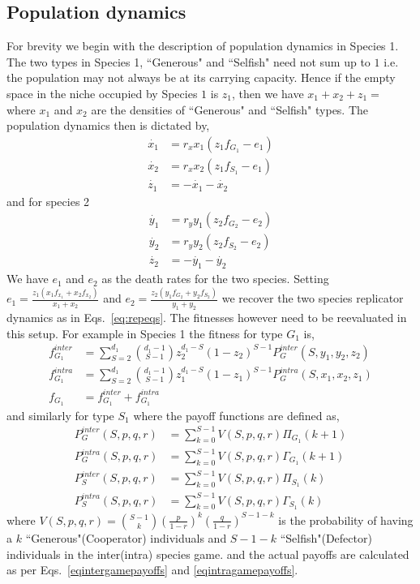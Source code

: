 \documentclass[12pt]{article}
\begin{document}
\begin{appendices}
\section{Population dynamics}

For brevity we begin with the description of population dynamics in Species 1.
The two types in Species 1, ``Generous" and ``Selfish" need not sum up to $1$ i.e. the population may not always be at its carrying capacity.
Hence if the empty space in the niche occupied by Species $1$ is $z_1$, then we have $x_1 + x_2 + z_1 = $ where $x_1$ and $x_2$ are the densities of ``Generous" and ``Selfish" types.
The population dynamics then is dictated by,
%
\begin{align}
	\dot{x_1} &= r_x x_1 (z_1 f_{G_1} - e_1) \\
	\dot{x_2} &= r_x x_2 (z_1 f_{S_1} - e_1) \\
	\dot{z_1} &= - \dot{x_1} - \dot{x_2}
\end{align}
%
and for species 2
\begin{align}
	\dot{y_1} &= r_y y_1 (z_2 f_{G_2} - e_2) \\
	\dot{y_2} &= r_y y_2 (z_2 f_{S_2} - e_2) \\
	\dot{z_2} &= - \dot{y_1} - \dot{y_2}
\end{align}
%
We have $e_1$ and $e_2$ as the death rates for the two species.
Setting $e_1 = \frac{z_1 (x_1 f_{x_1} + x_2 f_{x_2}) }{x_1 + x_2}$ and $e_2 = \frac{z_2 (y_1 f_{G_2} + y_2 f_{S_2}) }{y_1 + y_2}$ we recover the two species replicator dynamics as in Eqs.~\ref{eq:repeqs}.
The fitnesses however need to be reevaluated in this setup.
For example in Species 1 the fitness for type $G_1$ is,
%
\begin{align}
	f_{G_1}^{inter} &= \sum_{S=2}^{d_1} \binom{d_1 -1}{S-1} z_2 ^{d_1 -S} (1-z_2)^{S-1} P_G^{inter}(S,y_1,y_2,z_2) \\
	f_{G_1}^{intra} &= \sum_{S=2}^{d_1} \binom{d_1 -1}{S-1} z_1 ^{d_1 -S} (1-z_1)^{S-1} P_G^{intra}(S,x_1,x_2,z_1) \\
	f_{G_1} &= f_{G_1}^{inter} + f_{G_1}^{intra}
\end{align}
%
and similarly for type $S_1$ where the payoff functions are defined as,
%
\begin{align}
	P_G^{inter}(S,p,q,r) &= \sum_{k=0}^{S-1} V(S,p,q,r) \Pi_{G_1}(k+1) \\
	P_G^{intra}(S,p,q,r) &= \sum_{k=0}^{S-1} V(S,p,q,r) \Gamma_{G_1}(k+1) \\
	P_S^{inter}(S,p,q,r) &= \sum_{k=0}^{S-1} V(S,p,q,r) \Pi_{S_1}(k) \\
	P_S^{intra}(S,p,q,r) &= \sum_{k=0}^{S-1} V(S,p,q,r) \Gamma_{S_1}(k)
\end{align}
%
where $V(S,p,q,r) = \binom{S-1}{k} \left( \frac{p}{1-r}\right)^k  \left(\frac{q}{1-r}\right)^{S-1-k}$ is the probability of having a $k$ ``Generous"(Cooperator) individuals and $S-1-k$ ``Selfish"(Defector) individuals in the inter(intra) species game.
and the actual payoffs are calculated as per Eqs.~\ref{eqintergamepayoffs} and \ref{eqintragamepayoffs}.

\end{appendices}
\end{document}
